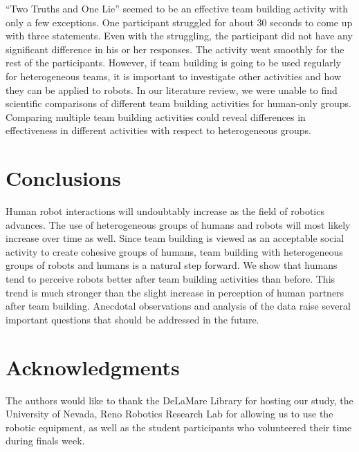 \documentclass{acm_proc_article-sp}
\begin{document}
``Two Truths and One Lie'' seemed to be an effective team building activity with only a few exceptions. One participant struggled for about 30 seconds to come up with three statements. Even with the struggling, the participant did not have any significant difference in his or her responses. The activity went smoothly for the rest of the participants. However, if team building is going to be used regularly for heterogeneous teams, it is important to investigate other activities and how they can be applied to robots. In our literature review, we were unable to find scientific comparisons of different team building activities for human-only groups. Comparing multiple team building activities could reveal differences in effectiveness in different activities with respect to heterogeneous groups.

\section{Conclusions}
\label{section:conclusions}
Human robot interactions will undoubtably increase as the field of robotics advances. The use of heterogeneous groups of humans and robots will most likely increase over time as well. Since team building is viewed as an acceptable social activity to create cohesive groups of humans, team building with heterogeneous groups of robots and humans is a natural step forward. We show that humans tend to perceive robots better after team building activities than before. This trend is much stronger than the slight increase in perception of human partners after team building. Anecdotal observations and analysis of the data raise several important questions that should be addressed in the future.  


\section{Acknowledgments}
\label{section:}
The authors would like to thank the DeLaMare Library for hosting our study, the University of Nevada, Reno Robotics Research Lab for allowing us to use the robotic equipment, as well as the student participants who volunteered their time during finals week.

%

\end{document}
